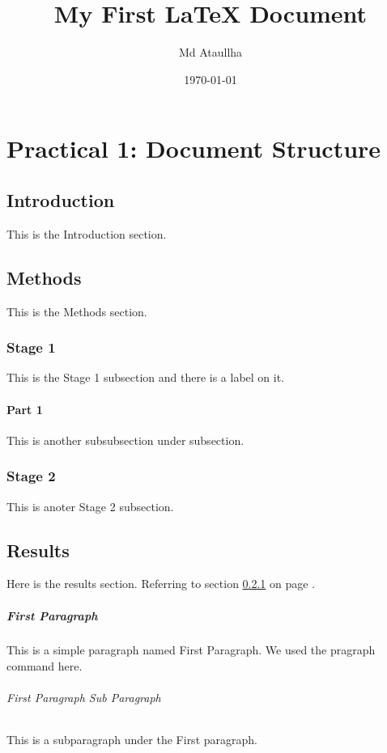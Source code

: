\documentclass[a4paper,12pt]{report}
\begin{document}
\title{My First LaTeX Document}
\author{Md Ataullha}
\date{\today}
\maketitle

\tableofcontents
\listoftables
\listoffigures
\newpage
{}

\chapter*{Practical 1: Document Structure}

\section{Introduction}This is the Introduction section.

\section{Methods} 
This is the Methods section.

\subsection{Stage 1}
\label{sec1}
This is the Stage 1 subsection and there is a label on it.
\subsubsection{Part 1}
This is another subsubsection under subsection.


\subsection{Stage 2}
This is anoter Stage 2 subsection.

\section{Results}
Here is the results section. Referring to section \ref{sec1} on page \pageref{sec1}.

\paragraph{First Paragraph}
This is a simple paragraph named First Paragraph. We used the pragraph command here.
\subparagraph{First Paragraph Sub Paragraph}
This is a subparagraph under the First paragraph.
\end{document}
